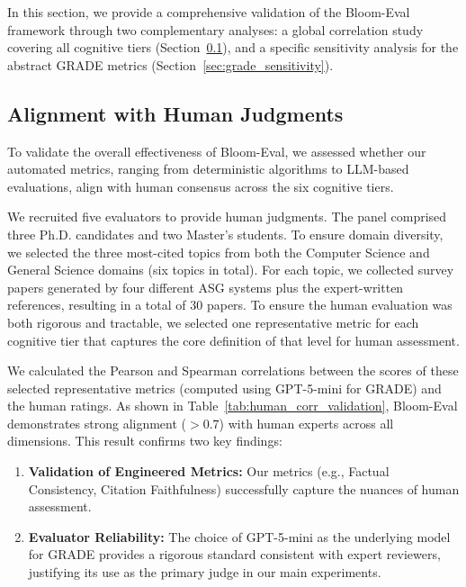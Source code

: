 \documentclass[11pt]{article}
\begin{document}
In this section, we provide a comprehensive validation of the Bloom-Eval framework through two complementary analyses: a global correlation study covering all cognitive tiers (Section~\ref{sec:human_correlation}), and a specific sensitivity analysis for the abstract GRADE metrics (Section~\ref{sec:grade_sensitivity}).

\subsection{Alignment with Human Judgments}
\label{sec:human_correlation}

To validate the overall effectiveness of Bloom-Eval, we assessed whether our automated metrics, ranging from deterministic algorithms to LLM-based evaluations, align with human consensus across the six cognitive tiers.

We recruited five evaluators to provide human judgments. The panel comprised three Ph.D. candidates and two Master's students. To ensure domain diversity, we selected the three most-cited topics from both the Computer Science and General Science domains (six topics in total). For each topic, we collected survey papers generated by four different ASG systems plus the expert-written references, resulting in a total of 30 papers. To ensure the human evaluation was both rigorous and tractable, we selected one representative metric for each cognitive tier that captures the core definition of that level for human assessment.

We calculated the Pearson and Spearman correlations between the scores of these selected representative metrics (computed using GPT-5-mini for GRADE) and the human ratings. As shown in Table~\ref{tab:human_corr_validation}, Bloom-Eval demonstrates strong alignment ($>0.7$) with human experts across all dimensions. This result confirms two key findings:
\begin{enumerate} 
\item \textbf{Validation of Engineered Metrics:} Our metrics (e.g., Factual Consistency, Citation Faithfulness) successfully capture the nuances of human assessment.

\item \textbf{Evaluator Reliability:} The choice of GPT-5-mini as the underlying model for GRADE provides a rigorous standard consistent with expert reviewers, justifying its use as the primary judge in our main experiments.
\end{enumerate}
\end{document}
